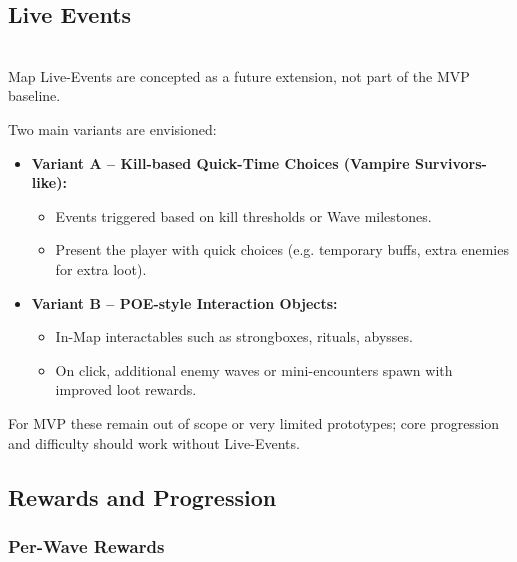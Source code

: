
\subsection{Live Events}\\

Map Live-Events are concepted as a future extension, not part of the MVP baseline.

Two main variants are envisioned:

\begin{itemize}
	\item \textbf{Variant A – Kill-based Quick-Time Choices (Vampire Survivors-like):}
	\begin{itemize}
		\item Events triggered based on kill thresholds or Wave milestones.
		\item Present the player with quick choices (e.g. temporary buffs, extra enemies for extra loot).
	\end{itemize}
	\item \textbf{Variant B – POE-style Interaction Objects:}
	\begin{itemize}
		\item In-Map interactables such as strongboxes, rituals, abysses.
		\item On click, additional enemy waves or mini-encounters spawn with improved loot rewards.
	\end{itemize}
\end{itemize}

For MVP these remain out of scope or very limited prototypes; core progression and difficulty should work without Live-Events.


\subsection{Rewards and Progression}

\subsubsection*{Per-Wave Rewards}

